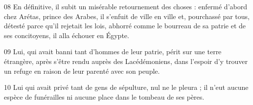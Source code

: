 
08 En définitive, il subit un misérable retournement des choses : enfermé d’abord chez Arétas, prince des Arabes, il s’enfuit de ville en ville et, pourchassé par tous, détesté parce qu’il rejetait les lois, abhorré comme le bourreau de sa patrie et de ses concitoyens, il alla échouer en Égypte.

09 Lui, qui avait banni tant d’hommes de leur patrie, périt sur une terre étrangère, après s’être rendu auprès des Lacédémoniens, dans l’espoir d’y trouver un refuge en raison de leur parenté avec son peuple.

10 Lui qui avait privé tant de gens de sépulture, nul ne le pleura ; il n’eut aucune espèce de funérailles ni aucune place dans le tombeau de ses pères.